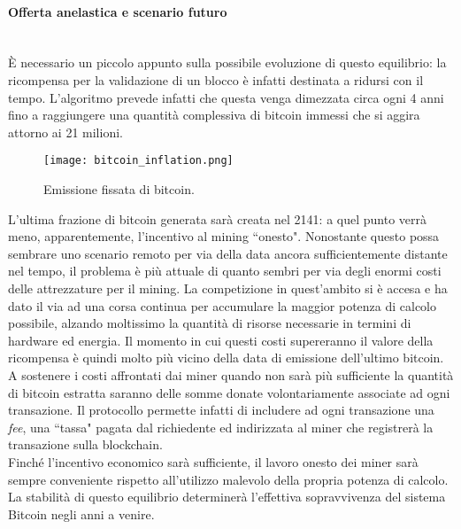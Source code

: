			\paragraph{Offerta anelastica e scenario futuro} ~ \\
				È necessario un piccolo appunto sulla possibile evoluzione di questo equilibrio: la ricompensa per la validazione di un blocco è infatti destinata a ridursi con il tempo. L'algoritmo prevede infatti che questa venga dimezzata circa ogni 4 anni fino a raggiungere una quantità complessiva di bitcoin immessi che si aggira attorno ai 21 milioni.
				\begin{figure}[ht]
					\centering
					\texttt{[image: bitcoin\_inflation.png]}
					\caption[Emissione fissata di bitcoin]{Emissione fissata di bitcoin.}
					\label{fig:bitcoin_supply}
				\end{figure}
				L'ultima frazione di bitcoin generata sarà creata nel 2141: a quel punto verrà meno, apparentemente, l'incentivo al mining ``onesto". Nonostante questo possa sembrare uno scenario remoto per via della data ancora sufficientemente distante nel tempo, il problema è più attuale di quanto sembri per via degli enormi costi delle attrezzature per il mining. La competizione in quest'ambito si è accesa e ha dato il via ad una corsa continua per accumulare la maggior potenza di calcolo possibile, alzando moltissimo la quantità di risorse necessarie in termini di hardware ed energia. Il momento in cui questi costi supereranno il valore della ricompensa è quindi molto più vicino della data di emissione dell'ultimo bitcoin. \\
				A sostenere i costi affrontati dai miner quando non sarà più sufficiente la quantità di bitcoin estratta saranno delle somme donate volontariamente associate ad ogni transazione. Il protocollo permette infatti di includere ad ogni transazione una \emph{fee}, una ``tassa" pagata dal richiedente ed indirizzata al miner che registrerà la transazione sulla blockchain. \\
				Finché l'incentivo economico sarà sufficiente, il lavoro onesto dei miner sarà sempre conveniente rispetto all'utilizzo malevolo della propria potenza di calcolo. La stabilità di questo equilibrio determinerà l'effettiva sopravvivenza del sistema Bitcoin negli anni a venire.